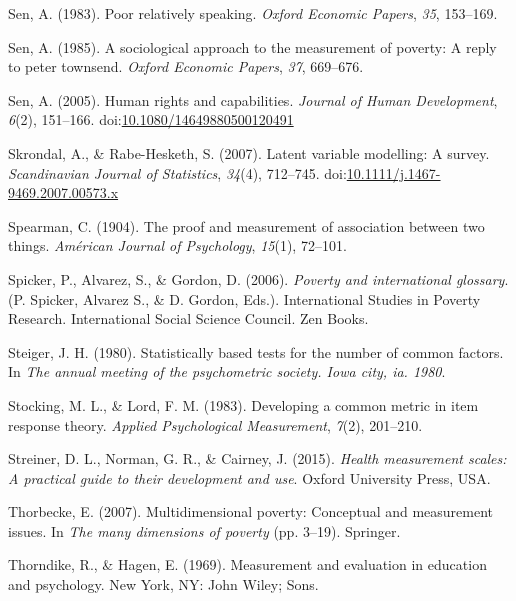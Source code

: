\documentclass[]{book}
\begin{document}
\leavevmode\hypertarget{ref-Sen1983}{}%
Sen, A. (1983). Poor relatively speaking. \emph{Oxford Economic Papers}, \emph{35}, 153--169.

\leavevmode\hypertarget{ref-Sen1985}{}%
Sen, A. (1985). A sociological approach to the measurement of poverty: A reply to peter townsend. \emph{Oxford Economic Papers}, \emph{37}, 669--676.

\leavevmode\hypertarget{ref-Sen2005}{}%
Sen, A. (2005). Human rights and capabilities. \emph{Journal of Human Development}, \emph{6}(2), 151--166. doi:\href{https://doi.org/10.1080/14649880500120491}{10.1080/14649880500120491}

\leavevmode\hypertarget{ref-Skrondal2007}{}%
Skrondal, A., \& Rabe-Hesketh, S. (2007). Latent variable modelling: A survey. \emph{Scandinavian Journal of Statistics}, \emph{34}(4), 712--745. doi:\href{https://doi.org/10.1111/j.1467-9469.2007.00573.x}{10.1111/j.1467-9469.2007.00573.x}

\leavevmode\hypertarget{ref-Spearman1904}{}%
Spearman, C. (1904). The proof and measurement of association between two things. \emph{Américan Journal of Psychology}, \emph{15}(1), 72--101.

\leavevmode\hypertarget{ref-Spicker2006}{}%
Spicker, P., Alvarez, S., \& Gordon, D. (2006). \emph{Poverty and international glossary}. (P. Spicker, Alvarez S., \& D. Gordon, Eds.). International Studies in Poverty Research. International Social Science Council. Zen Books.

\leavevmode\hypertarget{ref-Steiger1980}{}%
Steiger, J. H. (1980). Statistically based tests for the number of common factors. In \emph{The annual meeting of the psychometric society. Iowa city, ia. 1980}.

\leavevmode\hypertarget{ref-Stocking1983}{}%
Stocking, M. L., \& Lord, F. M. (1983). Developing a common metric in item response theory. \emph{Applied Psychological Measurement}, \emph{7}(2), 201--210.

\leavevmode\hypertarget{ref-Streiner2015}{}%
Streiner, D. L., Norman, G. R., \& Cairney, J. (2015). \emph{Health measurement scales: A practical guide to their development and use}. Oxford University Press, USA.

\leavevmode\hypertarget{ref-Thorbecke2007}{}%
Thorbecke, E. (2007). Multidimensional poverty: Conceptual and measurement issues. In \emph{The many dimensions of poverty} (pp. 3--19). Springer.

\leavevmode\hypertarget{ref-Thorndike1969}{}%
Thorndike, R., \& Hagen, E. (1969). Measurement and evaluation in education and psychology. New York, NY: John Wiley; Sons.
\end{document}
